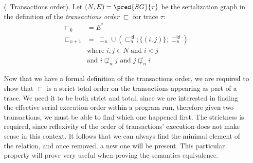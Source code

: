 \begin{center}
	\label{fig:orderBuild}
\end{center}

\begin{defn}
	(\tpl\ Transactions order). Let $(N, E) = \pred{SG}{\tau}$ be the serialization graph in the definition of the \emph{transactions order} $\sqsubset$ for trace $\tau$:
	\begin{align*}
		\sqsubset_0 &= E^* \\
		\sqsubset_{n + 1} &=\ \sqsubset_n \cup \left( \sqsubset_n^\mathsf{id} ; \{ (i, j) \} ; \sqsubset_n^\mathsf{id} \right) \\
		&\text{where } i, j \in N \text{ and } i < j \\
		&\text{and } i \not\sqsubset_n j \text{ and } j \not\sqsubset_n i
	\end{align*}
\end{defn}

Now that we have a formal definition of the transactions order, we are required to show that $\sqsubset$ is a strict total order on the transactions appearing as part of a trace. We need it to be both strict and total, since we are interested in finding the effective serial execution order within a program run, therefore given two transactions, we must be able to find which one happened first. The strictness is required, since reflexivity of the order of transactions' execution does not make sense in this context. It follows that we can always find the minimal element of the relation, and once removed, a new one will be present. This particular property will prove very useful when proving the semantics equivalence.

